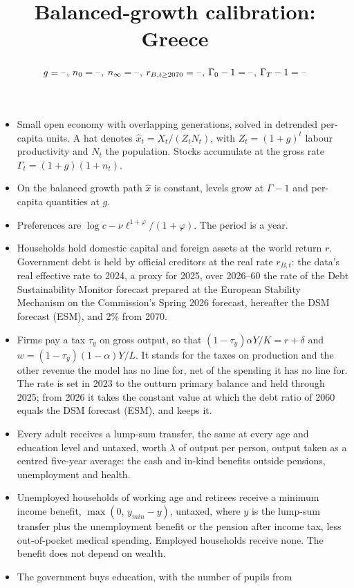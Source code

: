 \documentclass[11pt,a4paper]{article}
\title{\vspace{-1.6cm}Balanced-growth calibration: Greece}
\author{}
\date{\small $g=\text{--}$,\; $n_0=\text{--}$,\; $n_\infty=\text{--}$,\;
      $r_{B,t\ge 2070}=\text{--}$,\; $\Gamma_0-1=\text{--}$,\; $\Gamma_T-1=\text{--}$}
\begin{document}
\maketitle
\vspace{-0.6cm}

\noindent\small
\begin{itemize}
\item Small open economy with overlapping generations, solved in detrended
  per-capita units. A hat denotes $\hat x_t=X_t/(Z_tN_t)$, with
  $Z_t=(1+g)^t$ labour productivity and $N_t$ the population. Stocks
  accumulate at the gross rate $\Gamma_t=(1+g)(1+n_t)$.
\item On the balanced growth path $\hat x$ is constant, levels grow at
  $\Gamma-1$ and per-capita quantities at $g$.
\item Preferences are $\log c-\nu\ell^{1+\varphi}/(1+\varphi)$. The period is
  a year.
\item Households hold domestic capital and foreign assets at the world return
  $r$. Government debt is held by official creditors at the real rate
  $r_{B,t}$: the data's real effective rate to 2024, a proxy for 2025, over
  2026--60 the rate of the Debt Sustainability Monitor forecast prepared at
  the European Stability Mechanism on the Commission's Spring 2026 forecast,
  hereafter the DSM forecast (ESM), and 2\% from 2070.
\item Firms pay a tax $\tau_y$ on gross output, so that
  $(1-\tau_y)\alpha Y/K=r+\delta$ and $w=(1-\tau_y)(1-\alpha)Y/L$. It stands
  for the taxes on production and the other revenue the model has no line
  for, net of the spending it has no line for. The rate is set in 2023 to the
  outturn primary balance and held through 2025; from 2026 it takes the
  constant value at which the debt ratio of 2060 equals the DSM forecast
  (ESM), and keeps it.
\item Every adult receives a lump-sum transfer, the same at every age and
  education level and untaxed, worth $\lambda$ of output per person, output
  taken as a centred five-year average: the cash and in-kind benefits
  outside pensions, unemployment and health.
\item Unemployed households of working age and retirees receive a minimum
  income benefit, $\max(0,\,y_{min}-y)$, untaxed, where $y$ is the lump-sum
  transfer plus the unemployment benefit or the pension after income tax,
  less out-of-pocket medical spending. Employed households receive none.
  The benefit does not depend on wealth.
\item The government buys education, with the number of pupils from

\end{itemize}
\end{document}
